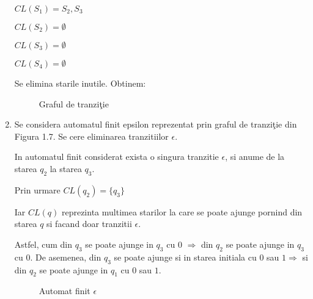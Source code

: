 \begin{enumerate}
$CL(S_{1})={S_{2},S_{3}}$

$CL(S_{2})=\emptyset$

$CL(S_{3})=\emptyset$

$CL(S_{4})=\emptyset$

Se elimina starile inutile. Obtinem:

\begin{figure}[H]
\caption{Graful de tranziţie}
\end{figure}

\item
Se considera automatul finit epsilon reprezentat prin graful de tranziţie  din Figura 1.7. Se cere eliminarea tranzitiilor $\epsilon$.

In automatul finit considerat exista o singura tranzitie $\epsilon$, si anume de la starea $ q_2$ la starea $q_3$.

Prin urmare $CL(q_2)=\{q_3\}$

Iar $CL(q)$ reprezinta multimea starilor la care se poate ajunge pornind din starea $q$ si facand doar tranzitii $\epsilon$. 

Astfel, cum din $q_3$ se poate ajunge in $q_3$ cu $0$ $\Rightarrow$ din $q_2$ se poate ajunge in $q_3$ cu $0$. De asemenea, din $q_3$ se poate ajunge si in starea initiala cu $0$ sau $1 \Rightarrow$ si din $q_2$ se poate ajunge in $q_1$ cu $0$ sau $1$.

\begin{figure}[H]
\caption{Automat finit $\epsilon$}
\end{figure}


\end{enumerate}
